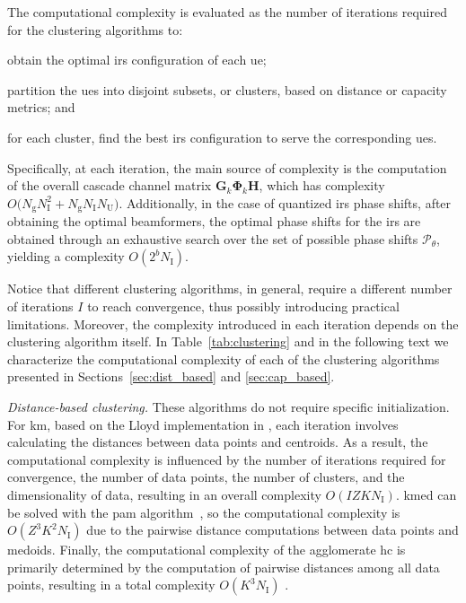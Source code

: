 The computational complexity is evaluated as the number of iterations required for the clustering algorithms to: \begin{enumerate*}[label=(\textit{\roman*})] 
\item obtain the optimal \gls{irs} configuration of each \gls{ue};
\item partition the \glspl{ue} into disjoint subsets, or clusters, based on distance or capacity metrics; and 
\item for each cluster, find the best \gls{irs} configuration to serve the corresponding \glspl{ue}.
\end{enumerate*}

Specifically, at each iteration, the main source of complexity is the computation of the overall cascade channel matrix $\bm{G}_k \bm{\Phi}_k \bm{H}$, which has complexity $O\big(N_{\mathrm g}N_{\mathrm I}^2 + N_{\mathrm g}N_{\mathrm I}N_{\mathrm U}\big)$.
Additionally, in the case of quantized \gls{irs} phase shifts, after obtaining the optimal beamformers, the optimal phase shifts for the \gls{irs} are obtained through an exhaustive search over the set of possible phase shifts $\mathcal{P}_{\theta}$, yielding a complexity $O(2^b N_{\mathrm I})$.

Notice that different clustering algorithms, in general, require a different number of iterations $I$ to reach convergence, thus possibly introducing practical limitations. Moreover, the complexity introduced in each iteration depends on the clustering algorithm itself. 
In Table~\ref{tab:clustering} and in the following text we characterize the computational complexity of each of the clustering algorithms presented in Sections~\ref{sec:dist_based} and \ref{sec:cap_based}.

\emph{Distance-based clustering.}
These algorithms do not require specific initialization.  
For \gls{km}, based on the Lloyd implementation in \cite{Kmeans}, each iteration involves calculating the distances between data points and centroids. As a result, the computational complexity is influenced by the number of iterations required for convergence, the number of data points, the number of clusters, and the dimensionality of data, resulting in an overall complexity $O(IZKN_{\mathrm I})$.  
\gls{kmed} can be solved with the \gls{pam} algorithm~\cite{van2003new}, so the computational complexity is $O(Z^3K^2N_{\mathrm I})$ due to the pairwise distance computations between data points and medoids. Finally, the computational complexity of the agglomerate \gls{hc} is primarily determined by the computation of pairwise distances among all data points, resulting in a total complexity $O(K^3N_{\mathrm I})$ \cite{xu2015comprehensive}.


